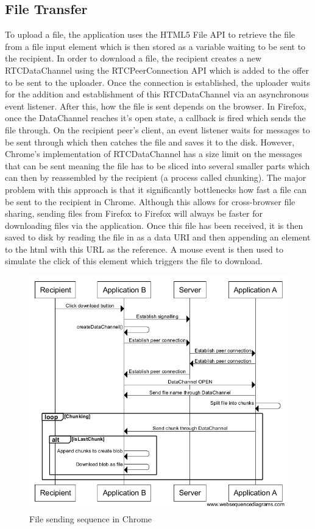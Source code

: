 \documentclass[]{report}
\begin{document}
			\subsection{File Transfer}
			To upload a file, the application uses the HTML5 File API to retrieve the file from a file input element which is then stored as a variable waiting to be sent to the recipient. In order to download a file, the recipient creates a new RTCDataChannel using the RTCPeerConnection API which is added to the offer to be sent to the uploader. Once the connection is established, the uploader waits for the addition and establishment of this RTCDataChannel via an asynchronous event listener. After this, how the file is sent depends on the browser. In Firefox, once the DataChannel reaches it's open state, a callback is fired which sends the file through. On the recipient peer's client, an event listener waits for messages to be sent through which then catches the file and saves it to the disk. However, Chrome's implementation of RTCDataChannel has a size limit on the messages that can be sent meaning the file has to be sliced into several smaller parts which can then by reassembled by the recipient (a process called chunking). The major problem with this approach is that it significantly bottlenecks how fast a file can be sent to the recipient in Chrome. Although this allows for cross-browser file sharing, sending files from Firefox to Firefox will always be faster for downloading files via the application. Once this file has been received, it is then saved to disk by reading the file in as a data URI and then appending an element to the html with this URL as the reference. A mouse event is then used to simulate the click of this element which triggers the file to download. 
			
			\begin{figure}[H]
				\caption{File sending sequence in Chrome}
				\centering
				\includegraphics[scale=0.5]{file-sending-sequence-chrome.png}
			\end{figure}
			
\end{document}
